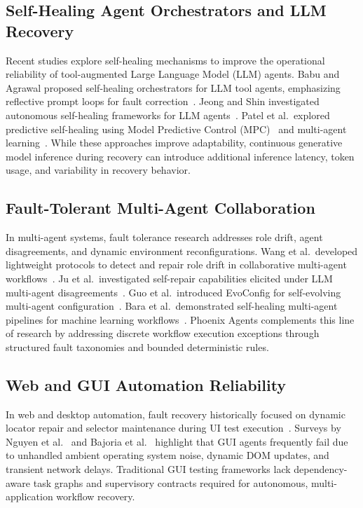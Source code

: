 \documentclass[conference]{IEEEtran}
\begin{document}
\subsection{Self-Healing Agent Orchestrators and LLM Recovery}
Recent studies explore self-healing mechanisms to improve the operational reliability of tool-augmented Large Language Model (LLM) agents. Babu and Agrawal proposed self-healing orchestrators for LLM tool agents, emphasizing reflective prompt loops for fault correction~\cite{babu2026}. Jeong and Shin investigated autonomous self-healing frameworks for LLM agents~\cite{jeong2026}. Patel et al.\ explored predictive self-healing using Model Predictive Control (MPC)~\cite{patel2026a} and multi-agent learning~\cite{patel2026b}. While these approaches improve adaptability, continuous generative model inference during recovery can introduce additional inference latency, token usage, and variability in recovery behavior.

\subsection{Fault-Tolerant Multi-Agent Collaboration}
In multi-agent systems, fault tolerance research addresses role drift, agent disagreements, and dynamic environment reconfigurations. Wang et al.\ developed lightweight protocols to detect and repair role drift in collaborative multi-agent workflows~\cite{wang2026}. Ju et al.\ investigated self-repair capabilities elicited under LLM multi-agent disagreements~\cite{ju2025}. Guo et al.\ introduced EvoConfig for self-evolving multi-agent configuration~\cite{guo2026}. Bara et al.\ demonstrated self-healing multi-agent pipelines for machine learning workflows~\cite{bara2026}. Phoenix Agents complements this line of research by addressing discrete workflow execution exceptions through structured fault taxonomies and bounded deterministic rules.

\subsection{Web and GUI Automation Reliability}
In web and desktop automation, fault recovery historically focused on dynamic locator repair and selector maintenance during UI test execution~\cite{garcia2026}. Surveys by Nguyen et al.~\cite{nguyen2025} and Bajoria et al.~\cite{bajoria2026} highlight that GUI agents frequently fail due to unhandled ambient operating system noise, dynamic DOM updates, and transient network delays. Traditional GUI testing frameworks lack dependency-aware task graphs and supervisory contracts required for autonomous, multi-application workflow recovery.
\end{document}
